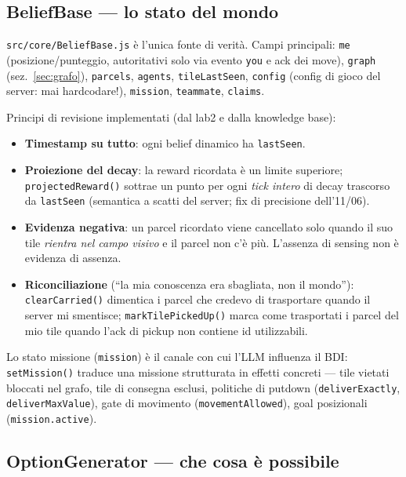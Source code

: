 \documentclass[11pt,a4paper]{article}
\newcommand{\file}[1]{\texttt{#1}}
\newcommand{\code}[1]{\texttt{#1}}
\begin{document}
\subsection{BeliefBase — lo stato del mondo}

\file{src/core/BeliefBase.js} è l'unica fonte di verità. Campi principali:
\code{me} (posizione/punteggio, autoritativi solo via evento \code{you} e
ack dei move), \code{graph} (sez.~\ref{sec:grafo}), \code{parcels},
\code{agents}, \code{tileLastSeen}, \code{config} (config di gioco del
server: mai hardcodare!), \code{mission}, \code{teammate}, \code{claims}.

Principi di revisione implementati (dal lab2 e dalla knowledge base):

\begin{itemize}
  \item \textbf{Timestamp su tutto}: ogni belief dinamico ha
    \code{lastSeen}.
  \item \textbf{Proiezione del decay}: la reward ricordata è un limite
    superiore; \code{projectedReward()} sottrae un punto per ogni
    \emph{tick intero} di decay trascorso da \code{lastSeen} (semantica a
    scatti del server; fix di precisione dell'11/06).
  \item \textbf{Evidenza negativa}: un parcel ricordato viene cancellato
    solo quando il suo tile \emph{rientra nel campo visivo} e il parcel
    non c'è più. L'assenza di sensing non è evidenza di assenza.
  \item \textbf{Riconciliazione} (``la mia conoscenza era sbagliata, non il
    mondo''): \code{clearCarried()} dimentica i parcel che credevo di
    trasportare quando il server mi smentisce; \code{markTilePickedUp()}
    marca come trasportati i parcel del mio tile quando l'ack di pickup
    non contiene id utilizzabili.
\end{itemize}

Lo stato missione (\code{mission}) è il canale con cui l'LLM influenza il
BDI: \code{setMission()} traduce una missione strutturata in effetti
concreti — tile vietati bloccati nel grafo, tile di consegna esclusi,
politiche di putdown (\code{deliverExactly}, \code{deliverMaxValue}), gate
di movimento (\code{movementAllowed}), goal posizionali
(\code{mission.active}).

\subsection{OptionGenerator — che cosa è possibile}
\end{document}
